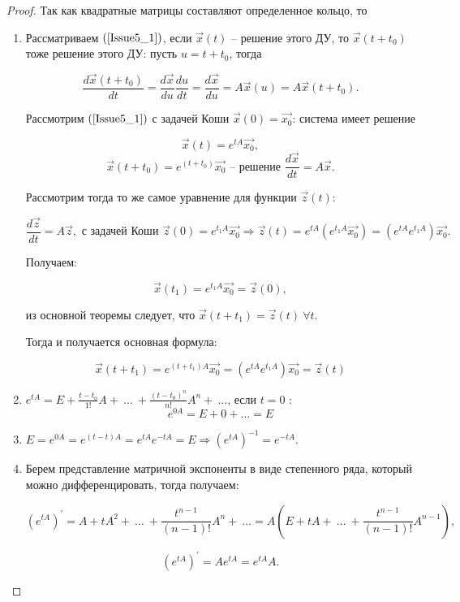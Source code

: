 \begin{proof}

Так как квадратные матрицы составляют определенное кольцо, то \\

\begin{enumerate}

	\item Рассматриваем $(\ref{Issue5_1})$, если $\overrightarrow{x}(t)$ -- решение этого ДУ, то $\overrightarrow{x}(t+t_0)$ тоже решение этого ДУ: пусть $u = t + t_0$, тогда

	\[ \frac{d\overrightarrow{x}(t+t_0)}{dt} = \frac{d\overrightarrow{x}}{du}\frac{du}{dt} = \frac{d\overrightarrow{x}}{du} = A\overrightarrow{x}(u) = A\overrightarrow{x}(t+t_0).\]

	Рассмотрим $(\ref{Issue5_1})$ с задачей Коши $\overrightarrow{x}(0) = \overrightarrow{x_0}$: система имеет решение

	\[ \overrightarrow{x}(t) =  e^{tA}\overrightarrow{x_0},\]
	\[ \overrightarrow{x}(t+t_0) = e^{(t+t_0)}\overrightarrow{x_0}\text{ -- решение }\frac{d\overrightarrow{x}}{dt} = A\overrightarrow{x}. \]

	Рассмотрим тогда то же самое уравнение для функции $\overrightarrow{z}(t)$:

	\[ \frac{d\overrightarrow{z}}{dt} = A\overrightarrow{z}, \text{ с задачей Коши } \overrightarrow{z}(0) = e^{t_1A}\overrightarrow{x_0} \Rightarrow \overrightarrow{z}(t) = e^{tA} (e^{t_1A}\overrightarrow{x_0}) = (e^{tA}e^{t_1A})\overrightarrow{x_0}.\]

	Получаем:

	\[ \overrightarrow{x}(t_1) = e^{t_1A}\overrightarrow{x_0} = \overrightarrow{z}(0),\]

	из основной теоремы следует, что $\overrightarrow{x}(t+t_1) = \overrightarrow{z}(t)\ \forall t$.

	Тогда и получается основная формула:

	\[ \overrightarrow{x}(t+t_1) = e^{(t+t_1)A}\overrightarrow{x_0} = (e^{tA}e^{t_1A})\overrightarrow{x_0} = \overrightarrow{z}(t)\]

	\item $ e^{tA} = E + \frac{t-t_0}{1!}A +\ \dots\ + \frac{(t-t_0)^n}{n!}A^n+\ \dots $, если $t = 0$ :
	\[ e^{0A} = E + 0 + \dots = E\]

	\item $E = e^{0A} = e^{(t-t)A} = e^{tA}e^{-tA} = E \Rightarrow \left(e^{tA}\right)^{-1} = e^{-tA}.$

	\item Берем представление матричной экспоненты в виде степенного ряда, который можно дифференцировать, тогда получаем:

	\[ (e^{tA})^{'} = A + tA^2 +\ \dots\ +\frac{t^{n-1}}{(n-1)!} A^n +\ \dots = A\left(E + tA +\ \dots\ + \frac{t^{n-1}}{(n-1)!}A^{n-1}\right),\]

	\[ (e^{tA})^{'} = Ae^{tA} = e^{tA}A.\]

\end{enumerate}

\end{proof}

